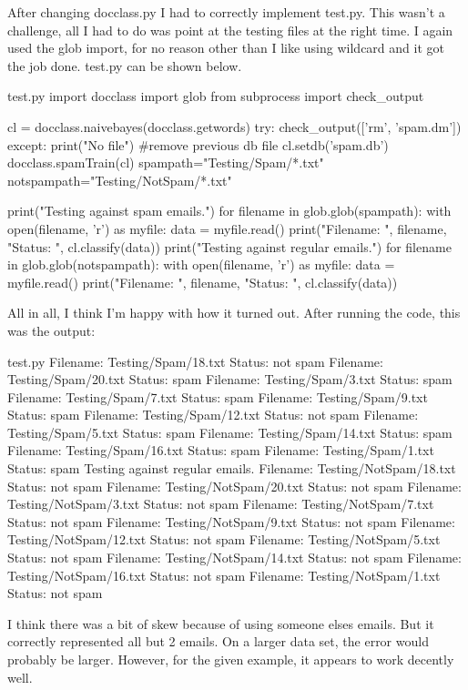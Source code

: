 \documentclass[11pt]{report}
\begin{document}
After changing docclass.py I had to correctly implement test.py. This wasn't a challenge, all I had to do was point at the testing files at the right time. I again used the glob import, for no reason other than I like using wildcard and it got the job done. test.py can be shown below. 
\begin{mylisting}{test.py}
import docclass
import glob
from subprocess import check_output

cl = docclass.naivebayes(docclass.getwords)
try:
  check_output(['rm', 'spam.dm'])
except:
  print("No file")
#remove previous db file
cl.setdb('spam.db')
docclass.spamTrain(cl)
spampath="Testing/Spam/*.txt"
notspampath="Testing/NotSpam/*.txt"

print("Testing against spam emails.")
for filename in glob.glob(spampath):
    with open(filename, 'r') as myfile:
        data = myfile.read()
        print("Filename: ", filename, "Status: ", cl.classify(data))
print("Testing against regular emails.")
for filename in glob.glob(notspampath):
    with open(filename, 'r') as myfile:
        data = myfile.read()
        print("Filename: ", filename, "Status: ", cl.classify(data))
\end{mylisting}

All in all, I think I'm happy with how it turned out. After running the code, this was the output:
\begin{mylisting}{test.py}
Filename:  Testing/Spam/18.txt Status:  not spam
Filename:  Testing/Spam/20.txt Status:  spam
Filename:  Testing/Spam/3.txt Status:  spam
Filename:  Testing/Spam/7.txt Status:  spam
Filename:  Testing/Spam/9.txt Status:  spam
Filename:  Testing/Spam/12.txt Status:  not spam
Filename:  Testing/Spam/5.txt Status:  spam
Filename:  Testing/Spam/14.txt Status:  spam
Filename:  Testing/Spam/16.txt Status:  spam
Filename:  Testing/Spam/1.txt Status:  spam
Testing against regular emails.
Filename:  Testing/NotSpam/18.txt Status:  not spam
Filename:  Testing/NotSpam/20.txt Status:  not spam
Filename:  Testing/NotSpam/3.txt Status:  not spam
Filename:  Testing/NotSpam/7.txt Status:  not spam
Filename:  Testing/NotSpam/9.txt Status:  not spam
Filename:  Testing/NotSpam/12.txt Status:  not spam
Filename:  Testing/NotSpam/5.txt Status:  not spam
Filename:  Testing/NotSpam/14.txt Status:  not spam
Filename:  Testing/NotSpam/16.txt Status:  not spam
Filename:  Testing/NotSpam/1.txt Status:  not spam
\end{mylisting}
	I think there was a bit of skew because of using someone elses emails. But it correctly represented all but 2 emails. On a larger data set, the error would probably be larger. However, for the given example, it appears to work decently well. 
\end{document}
